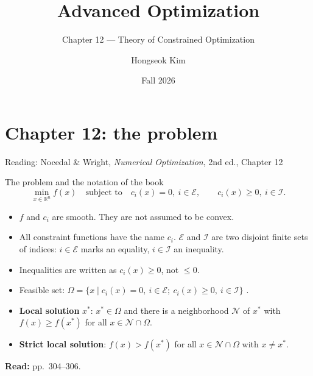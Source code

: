 \documentclass[aspectratio=169,12pt]{beamer}
\title{Advanced Optimization}
\subtitle{Chapter 12 --- Theory of Constrained Optimization}
\author{Hongseok Kim}
\institute{Department of Electronic Engineering, Sogang University}
\date{Fall 2026}
\newcommand{\R}{\mathbb{R}}
\newcommand{\xs}{x^{*}}
\newcommand{\eqn}[1]{\text{\small(#1)}}
\newcommand{\readbook}[1]{{\color{red}\textbf{Read:} #1}}
\newcommand{\cE}{\mathcal{E}}
\newcommand{\cI}{\mathcal{I}}
\begin{document}
\section{Chapter 12: the problem}

\begin{frame}
  \titlepage
  \begin{center}\small
    Reading: Nocedal \& Wright, \emph{Numerical Optimization}, 2nd ed., Chapter 12
  \end{center}
\end{frame}

\begin{frame}{The problem and the notation of the book}
  \[ \min_{x\in\R^{n}} f(x)\quad\text{subject to}\quad
     c_{i}(x)=0,\ i\in\cE,\qquad c_{i}(x)\ge 0,\ i\in\cI . \tag{12.1} \]
  \begin{itemize}\setlength\itemsep{0.3em}
    \item $f$ and $c_{i}$ are smooth. They are not assumed to be convex.
    \item All constraint functions have the name $c_{i}$. $\cE$ and $\cI$ are two disjoint finite sets
      of indices: $i\in\cE$ marks an equality, $i\in\cI$ an inequality.
    \item Inequalities are written as $c_{i}(x)\ge 0$, not $\le 0$.
    \item Feasible set: $\Omega=\{x\mid c_{i}(x)=0,\ i\in\cE;\ c_{i}(x)\ge 0,\ i\in\cI\}$ \eqn{12.2}.
    \item \textbf{Local solution} $\xs$: $\xs\in\Omega$ and there is a neighborhood $\mathcal{N}$ of $\xs$
      with $f(x)\ge f(\xs)$ for all $x\in\mathcal{N}\cap\Omega$.
    \item \textbf{Strict local solution}: $f(x)>f(\xs)$ for all $x\in\mathcal{N}\cap\Omega$ with $x\ne\xs$.
  \end{itemize}
  \readbook{pp.~304--306.}
\end{frame}
\end{document}
